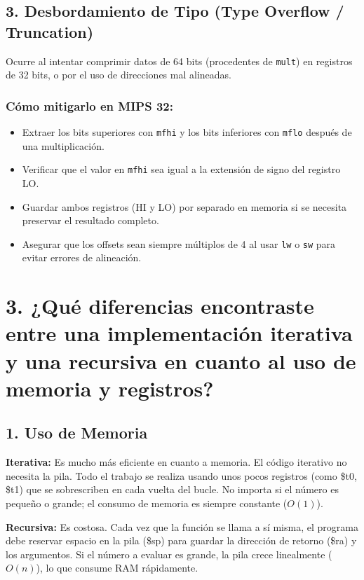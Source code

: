\documentclass[12pt]{article}
\begin{document}
\subsection*{3. Desbordamiento de Tipo (Type Overflow / Truncation)}

Ocurre al intentar comprimir datos de 64 bits (procedentes de \texttt{mult}) en registros de 32 bits, o por el uso de direcciones mal alineadas.

\subsubsection*{Cómo mitigarlo en MIPS 32:}

\begin{itemize}
    \item Extraer los bits superiores con \texttt{mfhi} y los bits inferiores con \texttt{mflo} después de una multiplicación.
    \item Verificar que el valor en \texttt{mfhi} sea igual a la extensión de signo del registro LO.
    \item Guardar ambos registros (HI y LO) por separado en memoria si se necesita preservar el resultado completo.
    \item Asegurar que los offsets sean siempre múltiplos de 4 al usar \texttt{lw} o \texttt{sw} para evitar errores de alineación.
\end{itemize}

\section*{3. ¿Qué diferencias encontraste entre una implementación iterativa y una recursiva en cuanto al uso de memoria y registros?}

\subsection*{1. Uso de Memoria}

\textbf{Iterativa:} Es mucho más eficiente en cuanto a memoria. El código iterativo no necesita la pila. Todo el trabajo se realiza usando unos pocos registros (como \$t0, \$t1) que se sobrescriben en cada vuelta del bucle. No importa si el número es pequeño o grande; el consumo de memoria es siempre constante ($O(1)$).

\textbf{Recursiva:} Es costosa. Cada vez que la función se llama a sí misma, el programa debe reservar espacio en la pila (\$sp) para guardar la dirección de retorno (\$ra) y los argumentos. Si el número a evaluar es grande, la pila crece linealmente ($O(n)$), lo que consume RAM rápidamente.
\end{document}
